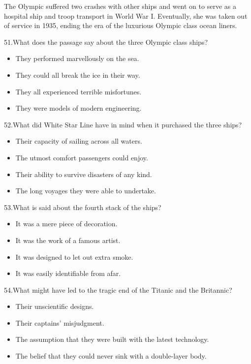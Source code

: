 \documentclass[UTF8,11pt]{ctexart}
\begin{document}
The Olympic suffered two crashes with other ships and went on to serve as a hospital ship and troop transport in World War I. Eventually, she was taken out of service in 1935, ending the era of the luxurious Olympic class ocean liners.


51.What does the passage say about the three Olympic class ships?


\begin{itemize}[leftmargin=2em,itemsep=.2em,topsep=.4em]\item[A.] They performed marvellously on the sea.
\item[B.] They could all break the ice in their way.
\item[C.] They all experienced terrible misfortunes.
\item[D.] They were models of modern engineering.
\end{itemize}

52.What did White Star Line have in mind when it purchased the three ships?


\begin{itemize}[leftmargin=2em,itemsep=.2em,topsep=.4em]\item[A.] Their capacity of sailing across all waters.
\item[B.] The utmost comfort passengers could enjoy.
\item[C.] Their ability to survive disasters of any kind.
\item[D.] The long voyages they were able to undertake.
\end{itemize}

53.What is said about the fourth stack of the ships?


\begin{itemize}[leftmargin=2em,itemsep=.2em,topsep=.4em]\item[A.] It was a mere piece of decoration.
\item[B.] It was the work of a famous artist.
\item[C.] It was designed to let out extra smoke.
\item[D.] It was easily identifiable from afar.
\end{itemize}

54.What might have led to the tragic end of the Titanic and the Britannic?


\begin{itemize}[leftmargin=2em,itemsep=.2em,topsep=.4em]\item[A.] Their unscientific designs.
\item[B.] Their captains' misjudgment.
\item[C.] The assumption that they were built with the latest technology.
\item[D.] The belief that they could never sink with a double-layer body.
\end{itemize}
\end{document}
